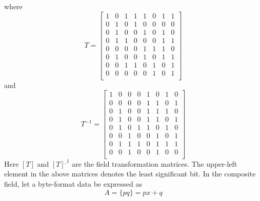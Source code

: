 \documentclass[10pt, conference, compsocconf]{IEEEtran}
\begin{document}
where
\begin{equation}
T = \left[ \begin{array}{cccccccc}
1 & 0 & 1 & 1 & 1 & 0 & 1 & 1 \\
0 & 1 & 0 & 1 & 0 & 0 & 0 & 0 \\
0 & 1 & 0 & 0 & 1 & 0 & 1 & 0 \\
0 & 1 & 1 & 0 & 0 & 0 & 1 & 1 \\
0 & 0 & 0 & 0 & 1 & 1 & 1 & 0 \\
0 & 1 & 0 & 0 & 1 & 0 & 1 & 1 \\
0 & 0 & 1 & 1 & 0 & 1 & 0 & 1 \\
0 & 0 & 0 & 0 & 0 & 1 & 0 & 1 \\
 \end{array} \right] 
\end{equation}
and
\begin{equation}
T^{-1} = \left[ \begin{array}{cccccccc}
1 & 0 & 0 & 0 & 1 & 0 & 1 & 0 \\
0 & 0 & 0 & 0 & 1 & 1 & 0 & 1 \\
0 & 1 & 0 & 0 & 1 & 1 & 1 & 0 \\
0 & 1 & 0 & 0 & 1 & 1 & 0 & 1 \\
0 & 1 & 0 & 1 & 1 & 0 & 1 & 0 \\
0 & 0 & 1 & 0 & 0 & 1 & 0 & 1 \\
0 & 1 & 1 & 1 & 0 & 1 & 1 & 1 \\
0 & 0 & 1 & 0 & 0 & 1 & 0 & 0 \\
 \end{array} \right]
\end{equation}
Here $[T]$ and $[T]^{\_ 1}$ are the field transformation matrices. The
upper-left element in the above matrices denotes the least significant bit. In
the composite field, let a byte-format data be expressed as
\begin{equation}
A=\{pq\}=px+q
\end{equation}

\end{document}
